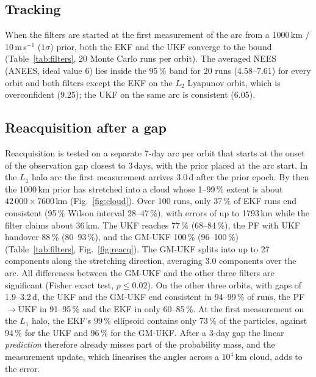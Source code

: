 \documentclass[pdflatex,sn-mathphys-num]{sn-jnl}
\begin{document}
\subsection{Tracking}
When the filters are started at the first measurement of the arc from a 1000\,km /
10\,m\,s$^{-1}$ ($1\sigma$) prior, both the EKF and the UKF converge to the bound
(Table~\ref{tab:filters}, 20 Monte Carlo runs per orbit). The averaged NEES (ANEES, ideal value 6)
lies inside the 95\,\% band for 20 runs (4.58--7.61) for every orbit and both filters except the EKF
on the $L_2$ Lyapunov orbit, which is overconfident (9.25); the UKF on the same arc is consistent
(6.05).

\subsection{Reacquisition after a gap}
Reacquisition is tested on a separate 7-day arc per orbit that starts at the onset of the observation
gap closest to 3\,days, with the prior placed at the arc start. In the $L_1$ halo arc the first
measurement arrives 3.0\,d after the prior epoch. By then the 1000\,km prior has stretched into a
cloud whose 1--99\,\% extent is about $42\,000 \times 7600$\,km (Fig.~\ref{fig:cloud}). Over 100 runs,
only 37\,\% of EKF runs end consistent (95\,\% Wilson interval 28--47\,\%), with errors of up to
1793\,km while the filter claims about 36\,km. The UKF reaches 77\,\% (68--84\,\%), the PF with UKF
handover 88\,\% (80--93\,\%), and the GM-UKF 100\,\% (96--100\,\%) (Table~\ref{tab:filters},
Fig.~\ref{fig:reacq}). The GM-UKF splits into up to 27 components along the stretching direction,
averaging 3.0 components over the arc. All differences between the GM-UKF and the other three filters
are significant (Fisher exact test, $p \le 0.02$). On the other three orbits, with gaps of
1.9--3.2\,d, the UKF and the GM-UKF end consistent in 94--99\,\% of runs, the PF$\to$UKF in
91--95\,\% and the EKF in only 60--85\,\%. At the first measurement on the $L_1$ halo, the EKF's
99\,\% ellipsoid contains only 73\,\% of the particles, against 94\,\% for the UKF and 96\,\% for
the GM-UKF. After a 3-day gap the linear \emph{prediction} therefore already misses part of the
probability mass, and the measurement update, which linearises the angles across a $10^4$\,km cloud,
adds to the error.
\end{document}
